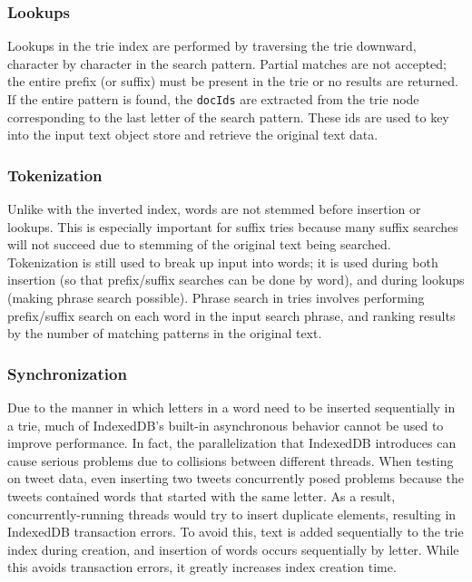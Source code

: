 \documentclass{vldb}
\begin{document}
\subsubsection{Lookups}
Lookups in the trie index are performed by traversing the trie downward, character by character in the search pattern. Partial matches are not accepted; the entire prefix (or suffix) must be present in the trie or no results are returned. If the entire pattern is found, the \texttt{docIds} are extracted from the trie node corresponding to the last letter of the search pattern. These ids are used to key into the input text object store and retrieve the original text data.

\subsubsection{Tokenization}
Unlike with the inverted index, words are not stemmed before insertion or lookups. This is especially important for suffix tries because many suffix searches will not succeed due to stemming of the original text being searched. Tokenization is still used to break up input into words; it is used during both insertion (so that prefix/suffix searches can be done by word), and during lookups (making phrase search possible). Phrase search in tries involves performing prefix/suffix search on each word in the input search phrase, and ranking results by the number of matching patterns in the original text. 

\subsubsection{Synchronization}
Due to the manner in which letters in a word need to be inserted sequentially in a trie, much of IndexedDB's built-in asynchronous behavior cannot be used to improve performance. In fact, the parallelization that IndexedDB introduces can cause serious problems due to collisions between different threads. When testing on tweet data, even inserting two tweets concurrently posed problems because the tweets contained words that started with the same letter. As a result, concurrently-running threads would try to insert duplicate elements, resulting in IndexedDB transaction errors. To avoid this, text is added sequentially to the trie index during creation, and insertion of words occurs sequentially by letter. While this avoids transaction errors, it greatly increases index creation time.
\end{document}
